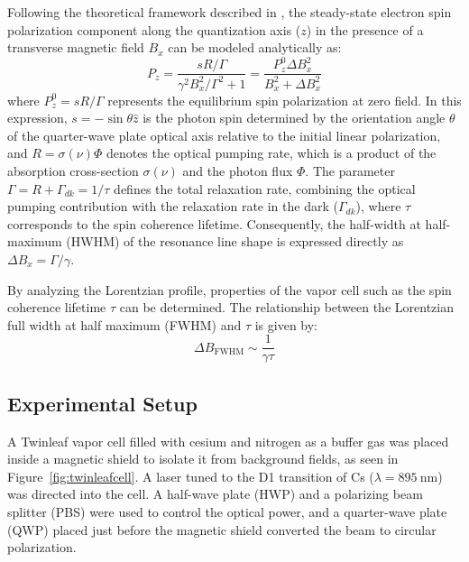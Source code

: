  Following the theoretical framework described in \cite{lucivero2022}, the steady-state electron spin 
 polarization component along the quantization axis ($z$) in the presence of a transverse magnetic 
 field $B_x$ can be modeled analytically as:
 \begin{equation}
     P_z = \frac{s R / \Gamma}{\gamma^2 B_x^2 / \Gamma^2 + 1} = \frac{P_z^0 \Delta B_x^2}{B_x^2 + \Delta B_x^2}
 \end{equation}
 where $P_z^0 = sR/\Gamma$ represents the equilibrium spin polarization at zero field. In this 
 expression, $s = -\sin\theta\hat{z}$ is the photon spin determined by the orientation 
 angle $\theta$ of the quarter-wave plate optical axis relative to the initial linear 
 polarization, and $R = \sigma(\nu)\Phi$ denotes the optical pumping rate, which is a 
 product of the absorption cross-section $\sigma(\nu)$ and the photon flux $\Phi$. 
 The parameter $\Gamma = R + \Gamma_{dk} = 1/\tau$ defines the total relaxation rate, 
 combining the optical pumping contribution with the relaxation rate in the dark 
 ($\Gamma_{dk}$), where $\tau$ corresponds to the spin coherence lifetime. Consequently, 
 the half-width at half-maximum (HWHM) of the resonance line shape is expressed directly 
 as $\Delta B_x = \Gamma / \gamma$.

 By analyzing the Lorentzian profile, properties of the vapor cell  
 such as the spin coherence lifetime $\tau$ can be determined. The  
 relationship between the Lorentzian full width at half maximum  
 (\gls{FWHM}) and $\tau$ is given by: 
 \begin{equation} 
     \Delta B_\text{FWHM} \sim \frac{1}{\gamma \tau} 
     \label{eq:tau} 
 \end{equation} 

 \subsection{Experimental Setup} 

 A Twinleaf vapor cell filled with cesium and nitrogen as a buffer  
 gas was placed inside a magnetic shield to isolate it from  
 background fields, as seen in Figure~\ref{fig:twinleafcell}. A laser tuned  
 to the D1 transition of Cs ($\lambda = \SI{895}{\nano\meter}$) was  
 directed into the cell. A half-wave plate (\gls{HWP}) and a  
 polarizing beam splitter (\gls{PBS}) were used to control the  
 optical power, and a quarter-wave plate (\gls{QWP}) placed just  
 before the magnetic shield converted the beam to circular  
 polarization. 

